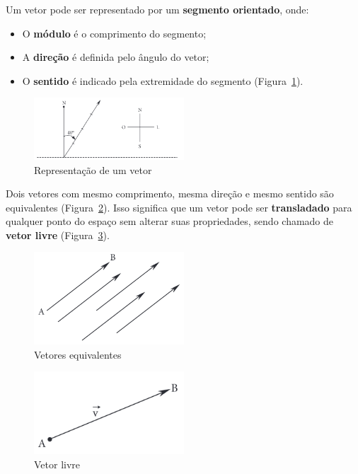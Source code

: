 Um vetor pode ser representado por um \textbf{segmento orientado}, onde:
\begin{itemize}
    \item O \textbf{módulo} é o comprimento do segmento;
    \item A \textbf{direção} é definida pelo ângulo do vetor;
    \item O \textbf{sentido} é indicado pela extremidade do segmento
      (Figura~\ref{fig:fig1.2}).
\end{itemize}

\begin{figure}[H]
    \centering
    \includegraphics[width=0.5\textwidth]{./fig/fig1.2.png}
    \caption{Representação de um vetor}\label{fig:fig1.2}
\end{figure}

Dois vetores com mesmo comprimento, mesma direção e mesmo sentido são
equivalentes (Figura~\ref{fig:fig1.3}). Isso significa que um vetor pode ser
\textbf{transladado} para qualquer ponto do espaço sem alterar suas
propriedades, sendo chamado de \textbf{vetor livre} (Figura~\ref{fig:fig1.4}).

\begin{figure}[H]
    \centering
    \includegraphics[width=0.5\textwidth]{./fig/fig1.3.png}
    \caption{Vetores equivalentes}\label{fig:fig1.3}
\end{figure}

\begin{figure}[H]
    \centering
    \includegraphics[width=0.5\textwidth]{./fig/fig1.4.png}
    \caption{Vetor livre}\label{fig:fig1.4}
\end{figure}

